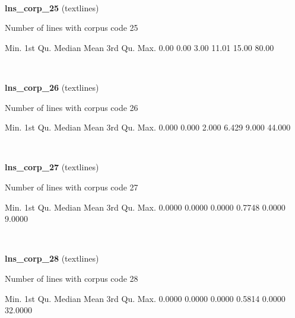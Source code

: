 \documentclass[]{article}
\newenvironment{Shaded}{\begin{snugshade}}{\end{snugshade}}
\newcommand{\FloatTok}[1]{\textcolor[rgb]{0.00,0.00,0.81}{{#1}}}
\newcommand{\NormalTok}[1]{{#1}}
\begin{document}
~

\vspace{1em}

\textbf{lns\_corp\_25} (textlines)

Number of lines with corpus code 25

\begin{Shaded}
\begin{Highlighting}[]
   \NormalTok{Min. 1st Qu.  Median    Mean 3rd Qu.    Max. }
   \FloatTok{0.00}    \FloatTok{0.00}    \FloatTok{3.00}   \FloatTok{11.01}   \FloatTok{15.00}   \FloatTok{80.00} 
\end{Highlighting}
\end{Shaded}

~

\vspace{1em}

\textbf{lns\_corp\_26} (textlines)

Number of lines with corpus code 26

\begin{Shaded}
\begin{Highlighting}[]
   \NormalTok{Min. 1st Qu.  Median    Mean 3rd Qu.    Max. }
  \FloatTok{0.000}   \FloatTok{0.000}   \FloatTok{2.000}   \FloatTok{6.429}   \FloatTok{9.000}  \FloatTok{44.000} 
\end{Highlighting}
\end{Shaded}

~

\vspace{1em}

\textbf{lns\_corp\_27} (textlines)

Number of lines with corpus code 27

\begin{Shaded}
\begin{Highlighting}[]
   \NormalTok{Min. 1st Qu.  Median    Mean 3rd Qu.    Max. }
 \FloatTok{0.0000}  \FloatTok{0.0000}  \FloatTok{0.0000}  \FloatTok{0.7748}  \FloatTok{0.0000}  \FloatTok{9.0000} 
\end{Highlighting}
\end{Shaded}

~

\vspace{1em}

\textbf{lns\_corp\_28} (textlines)

Number of lines with corpus code 28

\begin{Shaded}
\begin{Highlighting}[]
   \NormalTok{Min. 1st Qu.  Median    Mean 3rd Qu.    Max. }
 \FloatTok{0.0000}  \FloatTok{0.0000}  \FloatTok{0.0000}  \FloatTok{0.5814}  \FloatTok{0.0000} \FloatTok{32.0000} 
\end{Highlighting}
\end{Shaded}
\end{document}
